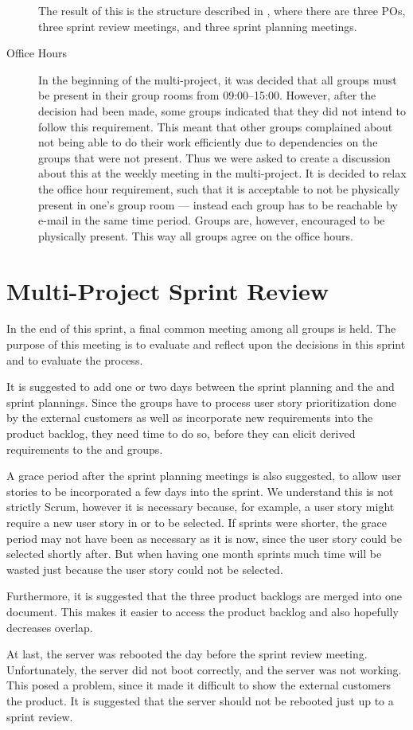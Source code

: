 \begin{description}
  The result of this is the structure described in , where there are three POs, three sprint review meetings, and three sprint planning meetings.
  \item[Office Hours] In the beginning of the multi-project, it was decided that all groups must be present in their group rooms from 09:00--15:00. However, after the decision had been made, some groups indicated that they did not intend to follow this requirement. This meant that other groups complained about not being able to do their work efficiently due to dependencies on the groups that were not present. Thus we were asked to create a discussion about this at the weekly meeting in the multi-project. It is decided to relax the office hour requirement, such that it is acceptable to not be physically present in one's group room --- instead each group has to be reachable by e-mail in the same time period. Groups are, however, encouraged to be physically present. This way all groups agree on the office hours.
\end{description}

\section{Multi-Project Sprint Review}\label{sec:s1_multiprj_review}
In the end of this sprint, a final common meeting among all groups is held. The purpose of this meeting is to evaluate and reflect upon the decisions in this sprint and to evaluate the process.

It is suggested to add one or two days between the \gui sprint planning and the \db and \bd sprint plannings. Since the \gui groups have to process user story prioritization done by the external customers as well as incorporate new requirements into the product backlog, they need time to do so, before they can elicit derived requirements to the \db and \bd groups.

A grace period after the sprint planning meetings is also suggested, to allow user stories to be incorporated a few days into the sprint. We understand this is not strictly Scrum, however it is necessary because, for example, a \db user story might require a new user story in \gui or \bd to be selected. If sprints were shorter, the grace period may not have been as necessary as it is now, since the user story could be selected shortly after. But when having one month sprints much time will be wasted just because the user story could not be selected.

Furthermore, it is suggested that the three product backlogs are merged into one document. This makes it easier to access the product backlog and also hopefully decreases overlap.

At last, the server was rebooted the day before the \gui sprint review meeting. Unfortunately, the server did not boot correctly, and the server was not working. This posed a problem, since it made it difficult to show the external customers the product. It is suggested that the server should not be rebooted just up to a sprint review.
